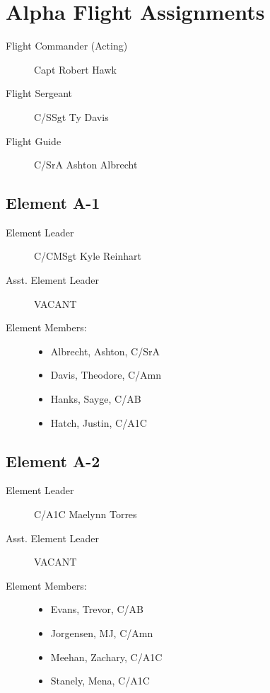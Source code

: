 \documentclass[12pt]{article}
\begin{document}
\section*{Alpha Flight Assignments}
\begin{description}
    \item[Flight Commander (Acting)] Capt Robert Hawk
    \item[Flight Sergeant] C/SSgt Ty Davis
    \item[Flight Guide] C/SrA Ashton Albrecht

\end{description}
\begin{multicols}{3}
    \subsection*{Element A-1}
    \begin{description}
        \item[Element Leader] C/CMSgt Kyle Reinhart
        \item[Asst. Element Leader] VACANT
        \item[Element Members:]\hfill
        \begin{itemize}
            \item Albrecht, Ashton, C/SrA
            \item Davis, Theodore, C/Amn
            \item Hanks, Sayge, C/AB
            \item Hatch, Justin, C/A1C
        \end{itemize}
    \end{description}

    \columnbreak

    \subsection*{Element A-2}
    \begin{description}
        \item[Element Leader] C/A1C Maelynn Torres
        \item[Asst. Element Leader] VACANT
        \item[Element Members:]\hfill
        \begin{itemize}
            \item Evans, Trevor, C/AB
            \item Jorgensen, MJ, C/Amn
            \item Meehan, Zachary, C/A1C
            \item Stanely, Mena, C/A1C
        \end{itemize}
    \end{description}


\end{multicols}
\end{document}
